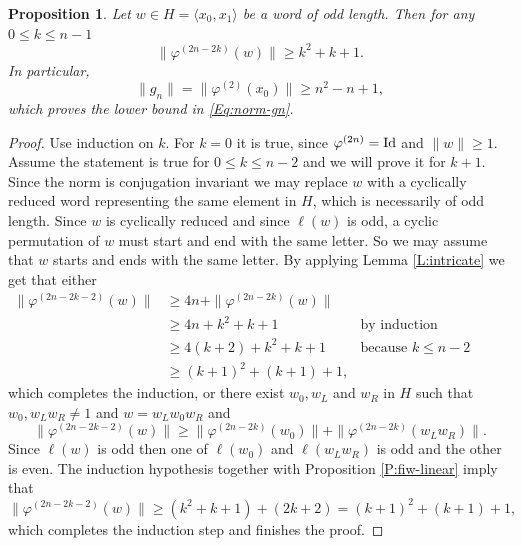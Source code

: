 \documentclass[12pt,reqno,a4paper]{article}
\newtheorem{proposition}[theorem]{Proposition}
\theoremstyle{definition}
\theoremstyle{remark}
\numberwithin{equation}{section}
\numberwithin{figure}{section}
\begin{document}
\begin{proposition}\label{P:final}
Let $w\in H=\langle x_0,x_1\rangle$ be a word of odd length.
Then for any $0\leq k\leq n-1$
$$
\|\varphi^{(2n-2k)}(w)\| \geq k^2+k+1.
$$
In particular,
$$
\|g_n\| = \|\varphi^{(2)}(x_0)\| \geq n^2-n+1,
$$
which proves the lower bound in \eqref{Eq:norm-gn}.
\end{proposition}
\begin{proof}
Use induction on $k$. 
For $k=0$ it is true, since $\varphi^{(2n)}={\rm Id}$ and $\|w\|\geq 1$.
Assume the statement is true for $0 \leq k\leq n-2$ and we will prove it for $k+1$.
Since the norm is conjugation invariant we may replace $w$ with a cyclically reduced word representing the same element in $H$, which is necessarily of odd length.
Since $w$ is cyclically reduced and since  $\ell(w)$ is odd, a cyclic permutation of $w$ must start and end with the same letter. 
So we may assume that $w$ starts and ends with the same letter.
By applying Lemma \ref{L:intricate} we get that either
\begin{align*}
\|\varphi^{(2n-2k-2)}(w)\|
&\geq 4n + \|\varphi^{(2n-2k)}(w)\|\\
&\geq 4n + k^2+k+1 &\text{by induction hypothesis}\\
&\geq 4(k+2) + k^2+k+1 &\text{because $k\leq n-2$}\\
&\geq (k+1)^2 + (k+1) + 1,
\end{align*}
which completes the induction, or there exist $w_0,w_L$ and $w_R$ in $H$ such that $w_0, w_Lw_R \neq 1$ and 
$w=w_Lw_0w_R$
and
$$
\|\varphi^{(2n-2k-2)}(w)\|\geq \|\varphi^{(2n-2k)}(w_0)\| + \|\varphi^{(2n-2k)}(w_Lw_R)\|.
$$
Since $\ell(w)$ is odd then one of $\ell(w_0)$ and $\ell(w_Lw_R)$ is odd and the other
is even. The induction hypothesis together with Proposition \ref{P:fiw-linear} imply that
$$
\|\varphi^{(2n-2k-2)}(w)\|\geq (k^2+k+1) + (2k+2) = (k+1)^2+(k+1)+1,
$$
which completes the induction step and finishes the proof.
\end{proof}
\end{document}
